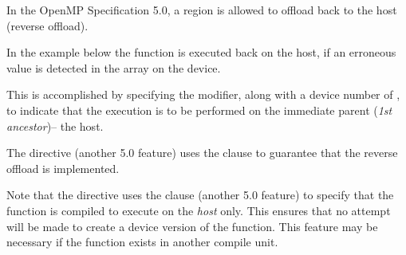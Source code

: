 
In the OpenMP Specification 5.0, a  region is allowed to
offload back to the host (reverse offload).

In the example below the  function
is executed back on the host, if an erroneous value is
detected in the  array on the device.

This is accomplished by specifying the 
 modifier, along with a device number of ,
to indicate that the execution is to be performed on the
immediate parent (\emph{1st ancestor})-- the host.

The  directive (another 5.0 feature)
uses the  clause to guarantee
that the reverse offload is implemented.

Note that the  directive uses the
 clause (another 5.0 feature) to specify that
the  function is compiled to
execute on the \emph{host} only. This ensures that no
attempt will be made to create a device version of the
function.  This feature may be necessary if the function
exists in another compile unit.



